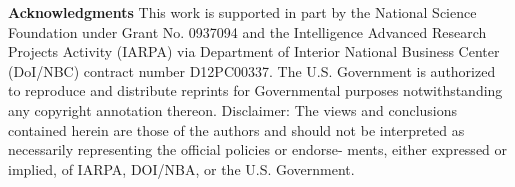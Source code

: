 \documentclass[letterpaper]{article}
\begin{document}

\linebreak
\textbf{Acknowledgments}
This work is supported in part by the National Science Foundation under Grant No. 0937094 and the Intelligence Advanced Research Projects Activity (IARPA) via Department of Interior National Business Center (DoI/NBC) contract number D12PC00337. The U.S. Government is authorized to reproduce and distribute reprints for Governmental purposes notwithstanding any copyright annotation thereon. Disclaimer: The views and conclusions contained herein are those of the authors and should not be interpreted as necessarily representing the official policies or endorse- ments, either expressed or implied, of IARPA, DOI/NBA, or the U.S. Government.
\linebreak
\linebreak
\linebreak
\linebreak


\end{document}
